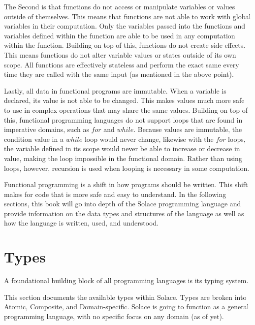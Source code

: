 \documentclass{article}
\begin{document}
The Second is that functions do not access or manipulate variables or values outside of themselves. This means
that functions are not able to work with global variables in their computation. Only the variables passed into
the functions and variables defined within the function are able to be used in any computation within the
function. Building on top of this, functions do not create side effects. This means functions do not alter
variable values or states outside of its own scope. All functions are effectively stateless and perform the
exact same every time they are called with the same input (as mentioned in the above point).

Lastly, all data in functional programs are immutable. When a variable is declared, its value is not able to
be changed. This makes values much more safe to use in complex operations that may share the same values. Building
on top of this, functional programming languages do not support loops that are found in imperative domains, such as
$for$ and $while$. Because values are immutable, the condition value in a $while$ loop would never change, likewise with
the $for$ loops, the variable defined in its scope would never be able to increase or decrease in value, making the loop
impossible in the functional domain. Rather than using loops, however, recursion is used when looping is necessary
in some computation.

Functional programming is a shift in how programs should be written. This shift makes for code that is more safe and easy to
understand. In the following sections, this book will go into depth of the Solace programming language and provide
information on the data types and structures of the language as well as how the language is written, used, and understood.


\section{Types}
A foundational building block of all programming languages is its typing system.

This section documents the available types within Solace. Types are broken into Atomic,
Composite, and Domain-specific. Solace is going to function as a general programming language,
with no specific focus on any domain (as of yet).
\end{document}

